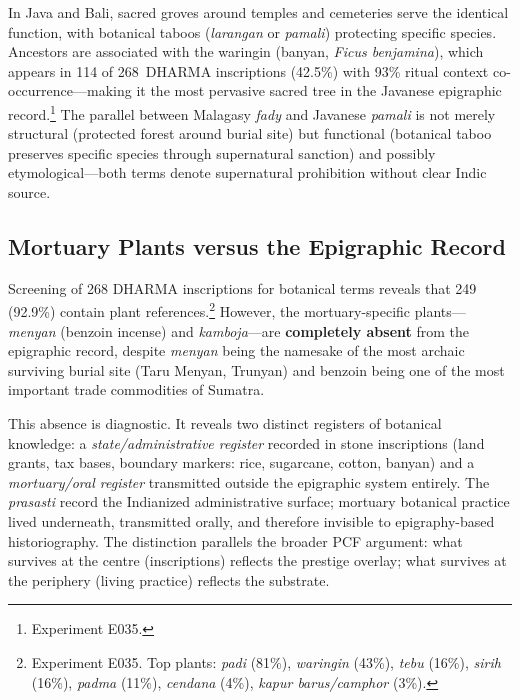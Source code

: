 \documentclass[12pt,a4paper]{article}
\begin{document}
In Java and Bali, sacred groves around temples and cemeteries serve the identical function, with botanical taboos (\emph{larangan} or \emph{pamali}) protecting specific species. Ancestors are associated with the waringin (banyan, \textit{Ficus benjamina}), which appears in 114 of 268~DHARMA inscriptions (42.5\%) with 93\% ritual context co-occurrence---making it the most pervasive sacred tree in the Javanese epigraphic record.\footnote{Experiment E035.} The parallel between Malagasy \emph{fady} and Javanese \emph{pamali} is not merely structural (protected forest around burial site) but functional (botanical taboo preserves specific species through supernatural sanction) and possibly etymological---both terms denote supernatural prohibition without clear Indic source.

\subsection{Mortuary Plants versus the Epigraphic Record}

Screening of 268 DHARMA inscriptions for botanical terms reveals that 249 (92.9\%) contain plant references.\footnote{Experiment E035. Top plants: \emph{padi} (81\%), \emph{waringin} (43\%), \emph{tebu} (16\%), \emph{sirih} (16\%), \emph{padma} (11\%), \emph{cendana} (4\%), \emph{kapur barus/camphor} (3\%).} However, the mortuary-specific plants---\emph{menyan} (benzoin incense) and \emph{kamboja}---are \textbf{completely absent} from the epigraphic record, despite \emph{menyan} being the namesake of the most archaic surviving burial site (Taru Menyan, Trunyan) and benzoin being one of the most important trade commodities of Sumatra.

This absence is diagnostic. It reveals two distinct registers of botanical knowledge: a \emph{state/administrative register} recorded in stone inscriptions (land grants, tax bases, boundary markers: rice, sugarcane, cotton, banyan) and a \emph{mortuary/oral register} transmitted outside the epigraphic system entirely. The \emph{prasasti} record the Indianized administrative surface; mortuary botanical practice lived underneath, transmitted orally, and therefore invisible to epigraphy-based historiography. The distinction parallels the broader PCF argument: what survives at the centre (inscriptions) reflects the prestige overlay; what survives at the periphery (living practice) reflects the substrate.

\end{document}
